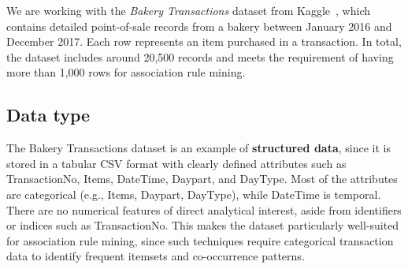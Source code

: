 \label{chap:data-understanding}

We are working with the \textit{Bakery Transactions} dataset from Kaggle~\cite{bakerydata}, which contains detailed point-of-sale records from a bakery between January 2016 and December 2017. 
Each row represents an item purchased in a transaction. 
In total, the dataset includes around 20,500 records and meets the requirement of having more than 1,000 rows for association rule mining.  

\subsection*{Data type}
The Bakery Transactions dataset is an example of \textbf{structured data}, 
since it is stored in a tabular CSV format with clearly defined attributes such as 
TransactionNo, Items, DateTime, Daypart, and DayType.  
Most of the attributes are categorical (e.g., Items, Daypart, DayType), 
while DateTime is temporal.  
There are no numerical features of direct analytical interest, aside from identifiers 
or indices such as TransactionNo.  
This makes the dataset particularly well-suited for association rule mining, 
since such techniques require categorical transaction data to identify frequent 
itemsets and co-occurrence patterns.

